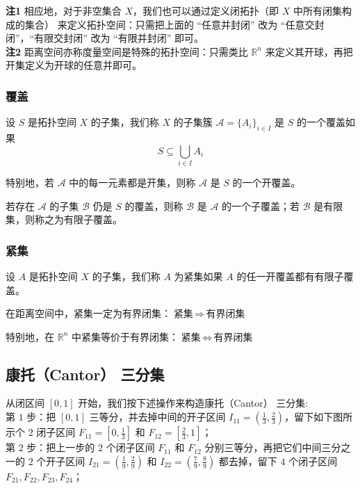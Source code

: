 \documentclass{ctexbook}
\newcommand{\R}{\mathbb{R}}
\begin{document}
{\bf 注1} 相应地，对于非空集合 $X$，我们也可以通过定义闭拓扑（即 $X$ 中所有闭集构成的集合） 来定义拓扑空间：只需把上面的 “任意并封闭” 改为 “任意交封闭”，“有限交封闭” 改为 “有限并封闭” 即可。\\

{\bf 注2} 距离空间亦称度量空间是特殊的拓扑空间：只需类比 $\R^{n}$ 来定义其开球，再把开集定义为开球的任意并即可。

\subsubsection{覆盖}

设 $S$ 是拓扑空间 $X$ 的子集，我们称 $X$ 的子集簇 $\mathcal{A}=\{A_i\}_{i \in I}$ 是 $S$  的一个覆盖如果 
\[
S\subseteq \bigcup_{i \in I} A_i
\]
\smallskip

特别地，若 $\mathcal{A}$ 中的每一元素都是开集，则称 $\mathcal{A}$ 是 $S$ 的一个开覆盖。
\smallskip

若存在 $\mathcal{A}$ 的子集 $\mathcal{B}$ 仍是 $S$ 的覆盖，则称 $\mathcal{B}$ 是 $\mathcal{A}$ 的一个子覆盖；若 $\mathcal{B}$ 是有限集，则称之为有限子覆盖。

\subsubsection{紧集}

设 $A$ 是拓扑空间 $X$ 的子集，我们称 $A$ 为紧集如果 $A$ 的任一开覆盖都有有限子覆盖。

在距离空间中，紧集一定为有界闭集：$\text{紧集} \,\Rightarrow\,\text{有界闭集}$

特别地，在 $\R^n$ 中紧集等价于有界闭集：$\text{紧集} \,\iff\,\text{有界闭集}$

\subsection{康托（Cantor） 三分集}

从闭区间 $[0,1]$ 开始，我们按下述操作来构造康托（Cantor） 三分集:\\

第 $1$ 步：把 $[0,1]$ 三等分，并去掉中间的开子区间 $I_{11}=\left(\frac13,\frac23\right)$，留下如下图所示个 $2$ 闭子区间 $F_{11}=\left[0,\frac13\right]$ 和 $F_{12}=\left[\frac23,1\right]$；\\

第 $2$ 步：把上一步的 $2$ 个闭子区间 $F_{11}$ 和 $F_{12}$ 分别三等分，再把它们中间三分之一的 $2$ 个开子区间 $I_{21}=(\frac19,\frac29)$ 和 $I_{22}=(\frac79,\frac89)$ 都去掉，留下 $4$ 个闭子区间 $F_{21}, F_{22}, F_{23}, F_{24}$；\\
\end{document}

